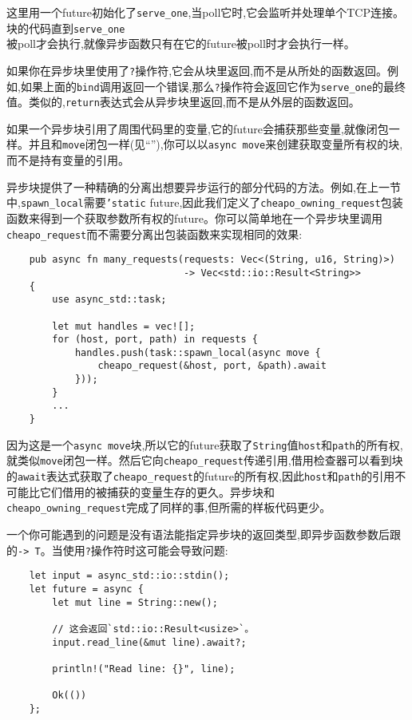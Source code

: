这里用一个future初始化了\texttt{serve\_one},当poll它时,它会监听并处理单个TCP连接。块的代码直到\texttt{serve\_one}\\
被poll才会执行,就像异步函数只有在它的future被poll时才会执行一样。

如果你在异步块里使用了\texttt{?}操作符,它会从块里返回,而不是从所处的函数返回。例如,如果上面的\texttt{bind}调用返回一个错误,那么\texttt{?}操作符会返回它作为\texttt{serve\_one}的最终值。类似的,\texttt{return}表达式会从异步块里返回,而不是从外层的函数返回。

如果一个异步块引用了周围代码里的变量,它的future会捕获那些变量,就像闭包一样。并且和\texttt{move}闭包一样(见“”),你可以以\texttt{async move}来创建获取变量所有权的块,而不是持有变量的引用。

异步块提供了一种精确的分离出想要异步运行的部分代码的方法。例如,在上一节中,\texttt{spawn\_local}需要\texttt{'static} future,因此我们定义了\texttt{cheapo\_owning\_request}包装函数来得到一个获取参数所有权的future。你可以简单地在一个异步块里调用\texttt{cheapo\_request}而不需要分离出包装函数来实现相同的效果:
\begin{verbatim}
    pub async fn many_requests(requests: Vec<(String, u16, String)>)
                               -> Vec<std::io::Result<String>>
    {
        use async_std::task;

        let mut handles = vec![];
        for (host, port, path) in requests {
            handles.push(task::spawn_local(async move {
                cheapo_request(&host, port, &path).await
            }));
        }
        ...
    }
\end{verbatim}

因为这是一个\texttt{async move}块,所以它的future获取了\texttt{String}值\texttt{host}和\texttt{path}的所有权,就类似\texttt{move}闭包一样。然后它向\texttt{cheapo\_request}传递引用,借用检查器可以看到块的\texttt{await}表达式获取了\texttt{cheapo\_request}的future的所有权,因此\texttt{host}和\texttt{path}的引用不可能比它们借用的被捕获的变量生存的更久。异步块和\\
\texttt{cheapo\_owning\_request}完成了同样的事,但所需的样板代码更少。

一个你可能遇到的问题是没有语法能指定异步块的返回类型,即异步函数参数后跟的\texttt{-> T}。当使用\texttt{?}操作符时这可能会导致问题:
\begin{verbatim}
    let input = async_std::io::stdin();
    let future = async {
        let mut line = String::new();

        // 这会返回`std::io::Result<usize>`。
        input.read_line(&mut line).await?;

        println!("Read line: {}", line);

        Ok(())
    };
\end{verbatim}

